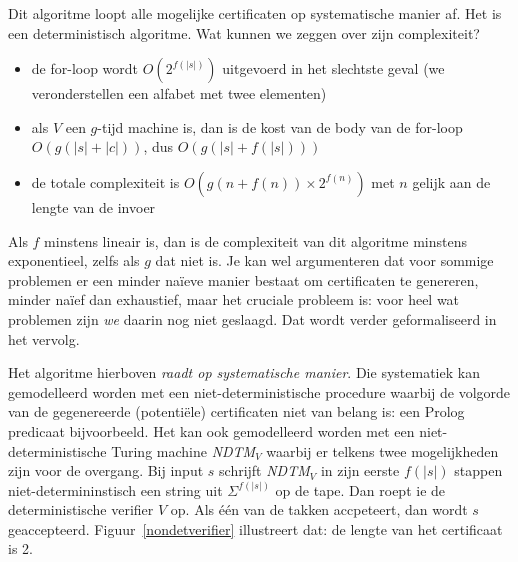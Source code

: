 \begin{algorithmic}
         \EndIf
    \EndFor
\end{algorithmic}

Dit algoritme loopt alle mogelijke certificaten op systematische
manier af. Het is een deterministisch algoritme. Wat kunnen we zeggen
over zijn complexiteit?

\begin{itemize}
\item 
de for-loop wordt $O(2^{f(|s|)})$ uitgevoerd in het slechtste geval
(we veronderstellen een alfabet met twee elementen)
\item 
als $V$ een $g$-tijd machine is, dan is de kost van de body van de for-loop
$O(g(|s|+|c|))$, dus $O(g(|s|+f(|s|)))$
\item
de totale complexiteit is $O(g(n+f(n))\times 2^{f(n)})$ met $n$ gelijk
aan de lengte van de invoer
\end{itemize}

Als $f$ minstens lineair is, dan is de complexiteit van dit algoritme
minstens exponentieel, zelfs als $g$ dat niet is. Je kan wel
argumenteren dat voor sommige problemen er een minder na\"ieve manier
bestaat om certificaten te genereren, minder na\"ief dan exhaustief,
maar het cruciale probleem is: voor heel wat problemen zijn {\em we}
daarin nog niet geslaagd. Dat wordt verder geformaliseerd in het
vervolg.

Het algoritme hierboven {\em raadt op systematische manier}. Die
systematiek kan gemodelleerd worden met een niet-deterministische
procedure waarbij de volgorde van de gegenereerde (potenti\"ele)
certificaten niet van belang is: een Prolog predicaat bijvoorbeeld.
Het kan ook gemodelleerd worden met een niet-deterministische Turing
machine {\em NDTM$_V$} waarbij er telkens twee mogelijkheden zijn voor de
overgang. Bij input $s$ schrijft {\em NDTM$_V$} in zijn eerste $f(|s|)$
stappen niet-determininstisch een string uit $\Sigma^{f(|s|)}$ op de
tape. Dan roept ie de deterministische verifier $V$ op. Als
\'{e}\'{e}n van de takken accpeteert, dan wordt $s$ geaccepteerd. 
Figuur~\ref{nondetverifier} illustreert dat: de lengte van het
certificaat is 2. 


